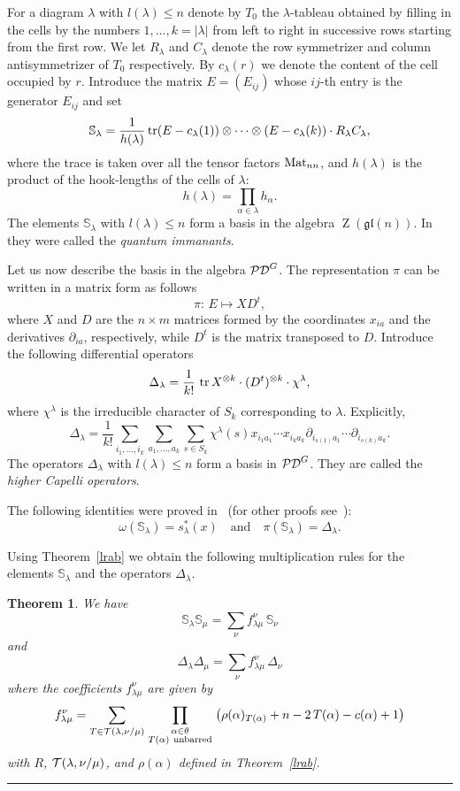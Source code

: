 \documentclass[titlepage,12pt]{article}
\newcommand{\bth}{\begin{thm}}
\renewcommand{\eth}{\end{thm}}
\newcommand{\beq}{\begin{equation}}
\newcommand{\eeq}{\end{equation}}
\newcommand{\qed}{\rule{1ex}{1ex}}
\newcommand{\qmq}[1]{\quad\mbox{#1}\quad}
\newcommand{\0}{{\bf 0}}
\newcommand{\1}{{\bf 1}}
\newcommand{\2}{{\bf 2}}
\newcommand{\3}{{\bf 3}}
\newcommand{\4}{{\bf 4}}
\newcommand{\5}{{\bf 5}}
\newcommand{\6}{{\bf 6}}
\newcommand{\7}{{\bf 7}}
\newcommand{\8}{{\bf 8}}
\newcommand{\9}{{\bf 9}}
\newcommand{\bbS}{{\mathbb S}}
\newcommand{\cPD}{{\cal PD}}
\newcommand{\cT}{{\cal T}}
\newcommand{\Mat}{\mathop{\rm Mat}\nolimits}
\newcommand{\tr}{\mathop{\rm tr}}
\newcommand{\scl}{\scriptstyle}
\newcommand{\scz}{\scriptsize}
\newcommand{\Z}{\mathop{Z}}
\newcommand{\gl}{\mathfrak{gl}}
\newcommand{\di}{\partial}
\newcommand{\ot}{\otimes}
\newcommand{\ts}{\,}
\newtheorem{thm}{Theorem}[section]
\begin{document}
For a diagram $\lambda$ with $l(\lambda)\leq n$
denote by $T_0$ the $\lambda$-tableau obtained by filling in the cells
by the numbers $1,\dots,k=|\lambda|$ 
from left to right in successive rows starting from the
first row. We let $R_{\lambda}$ and $C_{\lambda}$ denote
the row symmetrizer and column antisymmetrizer of $T_0$ respectively.
By $c_{\lambda}(r)$ we denote the content of the cell occupied by $r$.
Introduce the matrix $E=(E_{ij})$
whose $ij$-th entry is the generator $E_{ij}$ and set
$$
\bbS_{\lambda}=\frac{1}{h(\lambda)}\tr 
(E-c_{\lambda}(1))\ot\cdots\ot (E-c_{\lambda}(k))\cdot
R_{\lambda}C_{\lambda},
$$
where the trace is taken over all the tensor factors $\Mat_{nn}$, and
$h(\lambda)$ is the product of the hook-lengths of the cells of $\lambda$:
$$
h(\lambda)=\prod_{\alpha\in\lambda}h_{\alpha}.
$$ 
The elements $\bbS_{\lambda}$ with $l(\lambda)\leq n$
form a basis in the algebra $\Z(\gl(n))$. In~\cite{oko:qih} they
were called the {\it quantum immanants\/}.

Let us now describe the basis in the algebra $\cPD^G$.
The representation $\pi$ can be written in a matrix form as follows
$$
\pi:\ts E\mapsto XD^t,
$$
where $X$ and $D$ are the $n\times m$ matrices formed
by the coordinates $x_{ia}$ and the derivatives $\di_{ia}$, respectively,
while $D^t$ is the matrix transposed to $D$.
Introduce the following differential operators
$$
\Delta_{\lambda}=\frac{1}{k!}\ts
\tr X^{\ot k}\cdot (D^t)^{\ot k}\cdot \chi^{\lambda},
$$
where $\chi^{\lambda}$ is the irreducible character of $S_k$
corresponding to $\lambda$. Explicitly,
$$
\Delta_{\lambda}=\frac{1}{k!}\sum_{i_1,\dots,i_k}\sum_{a_1,\dots,a_k}
\sum_{s\in S_k}\chi^{\lambda}(s)x_{i_1a_1}\cdots x_{i_ka_k}
\di_{i_{s(1)}a_1}\cdots \di_{i_{s(k)}a_k}.
$$
The operators $\Delta_{\lambda}$ with $l(\lambda)\leq n$ form a basis
in $\cPD^G$. They are called the {\it higher Capelli operators\/}.

The following identities were proved in~\cite{oko:qih} 
(for other proofs see~\cite{naz:yci,oko:ybw,mol:fss}):
$$ 
\omega(\bbS_{\lambda})=s^*_{\lambda}(x) \qmq{and}
\pi(\bbS_{\lambda})=\Delta_{\lambda}.
$$

Using Theorem~\ref{lrab} we obtain the following multiplication rules for
the
elements $\bbS_{\lambda}$ and the operators $\Delta_{\lambda}$.

\bth
We have
$$
\bbS_{\lambda}\bbS_{\mu}=\sum_{\nu}f_{\lambda\mu}^{\nu}\ts\bbS_{\nu}
$$
and
$$
\Delta_{\lambda}\Delta_{\mu}=\sum_{\nu}f_{\lambda\mu}^{\nu}\ts\Delta_{\nu}
$$
where the coefficients $f_{\lambda\mu}^{\nu}$ are given by
\beq						\label{f}
f_{\lambda\mu}^{\nu}=\sum_{T\in\cT(\lambda,\nu/\mu)}
\prod_{\scl\alpha\in\theta\atop\scl T(\alpha)\ \mbox{\scz unbarred}}
\left(\rho(\alpha)_{T(\alpha)}+n-2\ts T(\alpha)-c(\alpha)+1\right)
\eeq
with $R$, $\cT(\lambda,\nu/\mu)$, and $\rho(\alpha)$ defined in
Theorem~\ref{lrab}.  \hfill\qed
\eth
\end{document}
